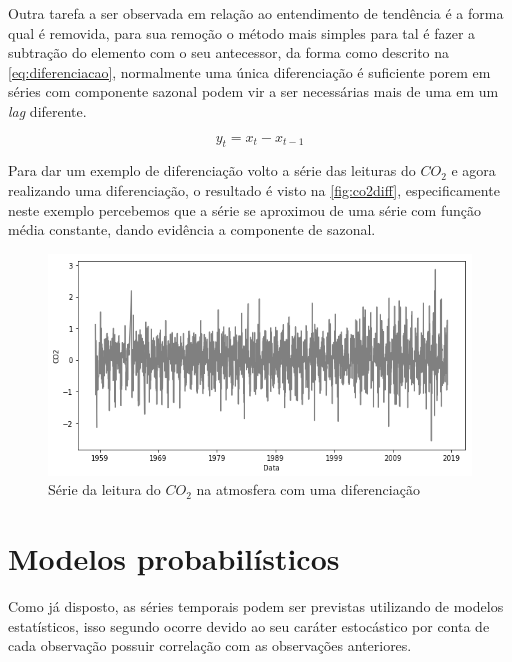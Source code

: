 \documentclass[
    12pt,
    oneside,
    a4paper,
    english,
    brazil
]{abntex2}
\begin{document}
Outra tarefa a ser observada em relação ao entendimento de tendência é a forma 
qual é removida, para sua remoção o método mais simples para tal é fazer a 
subtração do elemento com o seu antecessor, da forma como descrito na 
\autoref{eq:diferenciacao}, normalmente uma única diferenciação é suficiente 
porem em séries com componente sazonal podem vir a ser necessárias mais de uma 
em um \textit{lag} diferente.

\begin{equation}
    \label{eq:diferenciacao}
    y_t = x_t - x_{t-1}
\end{equation}

Para dar um exemplo de diferenciação volto a série das leituras do $CO_2$ e agora 
realizando uma diferenciação, o resultado é visto na \autoref{fig:co2diff}, 
especificamente neste exemplo percebemos que a série se aproximou de uma série 
com função média constante, dando evidência a componente de sazonal.

\begin{figure}
    \centering
    \caption{Série da leitura do $CO_2$ na atmosfera com uma 
    diferenciação}\label{fig:co2diff}
    \includegraphics[width=.6\linewidth]{images/co2_diff.png}
\end{figure}

%


\section{Modelos probabilísticos}

Como já disposto, as séries temporais podem ser previstas utilizando de modelos 
estatísticos, isso segundo  ocorre devido ao seu caráter 
estocástico por conta de cada observação possuir correlação com as observações 
anteriores.
\end{document}
